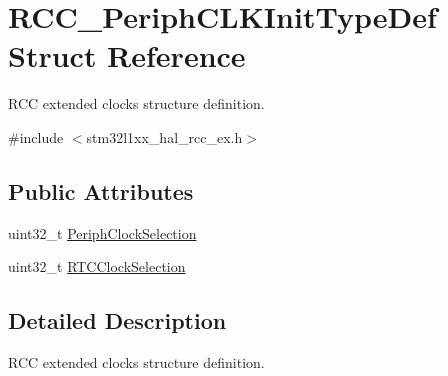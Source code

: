 \hypertarget{struct_r_c_c___periph_c_l_k_init_type_def}{\section{R\-C\-C\-\_\-\-Periph\-C\-L\-K\-Init\-Type\-Def Struct Reference}
\label{struct_r_c_c___periph_c_l_k_init_type_def}
}


R\-C\-C extended clocks structure definition.  




{\ttfamily \#include $<$stm32l1xx\-\_\-hal\-\_\-rcc\-\_\-ex.\-h$>$}

\subsection*{Public Attributes}
\begin{DoxyCompactItemize}
\item 
uint32\-\_\-t \hyperlink{struct_r_c_c___periph_c_l_k_init_type_def_a1fe6e3d75864d85b911eef15dfc35925}{Periph\-Clock\-Selection}
\item 
uint32\-\_\-t \hyperlink{struct_r_c_c___periph_c_l_k_init_type_def_ad2c422d62b056a61d7bbb599c89dbc1e}{R\-T\-C\-Clock\-Selection}
\end{DoxyCompactItemize}


\subsection{Detailed Description}
R\-C\-C extended clocks structure definition. 

